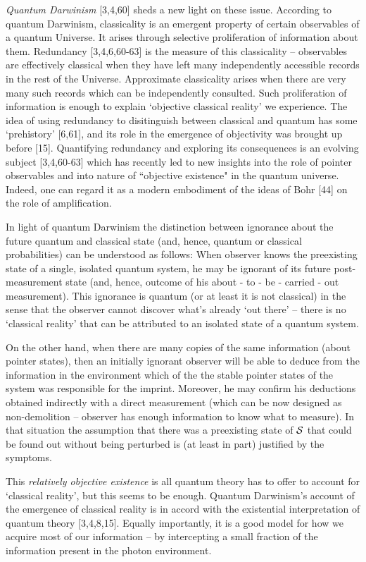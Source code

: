 \documentclass[aps,pra,epsfig,11pt,floatfix]{revtex4}
\begin{document}
{\it Quantum Darwinism} [3,4,60] sheds a new light on these issue. According to
quantum Darwinism, classicality is an emergent property of certain observables
of a quantum Universe. It arises through selective proliferation of information
about them. Redundancy [3,4,6,60-63] is the measure of this classicality
-- observables are effectively classical when they have left many independently
accessible records in the rest of the Universe.  Approximate classicality 
arises when there are very many such records which can be independently
consulted. Such proliferation of information is enough to explain 
`objective classical reality' we experience. The idea of using redundancy 
to disitinguish between classical and quantum has some `prehistory' [6,61], and 
its role in the emergence of objectivity was brought up before [15]. Quantifying 
redundancy and exploring its consequences is an evolving subject
[3,4,60-63] which has recently led to new insights into the role of pointer
observables and into nature of ``objective existence" in the quantum universe.
Indeed, one can regard it as a modern embodiment of the ideas of Bohr [44] on
the role of amplification.

In light of quantum Darwinism the distinction between ignorance
about the future quantum and classical state (and, hence, quantum or classical
probabilities) can be understood as follows: When observer knows the 
preexisting state of a single, isolated quantum system, he may be ignorant of 
its future post-measurement state (and, hence, outcome of his about - to - be 
- carried - out measurement). This ignorance is quantum (or at least it is not classical) 
in the sense that the observer cannot discover what's already `out there' -- there is no 
`classical reality' that can be attributed to an isolated state of a quantum system. 

On the other hand, when there are many copies of the same information 
(about pointer states), then an initially ignorant observer will be able to 
deduce from the information in the environment which of the the stable 
pointer states of the system was responsible for the imprint. Moreover, he may
confirm his deductions obtained indirectly with a direct measurement (which can
be now designed as non-demolition -- observer has enough information to know
what to measure). In that situation the assumption that there was a preexisting
state of ${\cal S}$ that could be found out without being perturbed is (at least
in part) justified by the symptoms. 

This {\it relatively objective existence}
is all quantum theory has to offer to account for `classical reality', but this
seems to be enough. Quantum Darwinism's account of the emergence of classical
reality is in accord with the existential interpretation of quantum theory
[3,4,8,15]. Equally importantly, it is a good model for how we acquire most of
our information -- by intercepting a small fraction of the information present
in the photon environment. 
\end{document}
